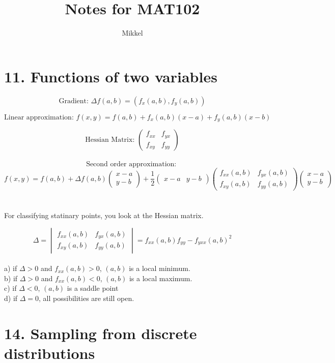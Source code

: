 \documentclass{article}
\author{Mikkel}
\title{Notes for MAT102}
\begin{document}
\maketitle
\tableofcontents
\clearpage

\section{11. Functions of two variables}
\hfill \break
\[
\text{Gradient: } 
\Delta f(a,b) = (f_x(a,b),f_y(a,b))
\]

\[
\text{Linear approximation: }
f(x,y)=f(a,b)+f_x(a,b)(x-a)+f_y(a,b)(x-b)
\]

\[
\text{Hessian Matrix: }
\begin{pmatrix}
f_{xx} & f_{yx} \\
f_{xy} & f_{yy}
\end{pmatrix}
\]
\\
\[
\text{Second order approximation: }
\]
\[
f(x,y)=f(a,b)+\Delta f(a,b) \begin{pmatrix}
x-a \\
y-b
\end{pmatrix} + \frac{1}{2}\begin{pmatrix}x-a & y-b \end{pmatrix}\begin{pmatrix} f_{xx}(a,b) & f_{yx}(a,b) \\
f_{xy}(a,b) & f_{yy}(a,b)\end{pmatrix} \begin{pmatrix}x-a\\ y-b \end{pmatrix}
\]
\\
\\For classifying statinary points, you look at the Hessian matrix.

\[
\Delta = \begin{vmatrix}
f_{xx}(a,b) & f_{yx}(a,b)\\
f_{xy}(a,b) & f_{yy}(a,b)
\end{vmatrix} = f_{xx}(a,b)f_{yy}-f_{yxx}(a,b)^2
\]
\\
a) if $\Delta > 0$ and $f_{xx}(a,b) > 0$, $(a,b)$ is a local minimum.\\
b) if $\Delta > 0$ and $f_{xx}(a,b) < 0$, $(a,b)$ is a local maximum.\\
c) if $\Delta < 0$, $(a,b)$ is a saddle point\\
d) if $\Delta = 0$, all possibilities are still open.

\hfill \break
\section{14. Sampling from discrete distributions}
\hfill \break
\end{document}

